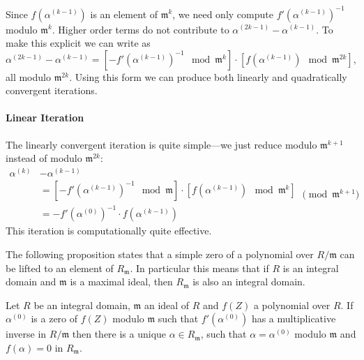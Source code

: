 {Since $f(\alpha^{(k-1)})$ is an element of $\mathfrak{m}^k$, we need
only compute $f'(\alpha^{(k-1)})^{-1}$ modulo $\mathfrak{m}^k$.
Higher order terms do not contribute to $\alpha^{(2k-1)} -
\alpha^{(k-1)}$.  To make this explicit we can write
 as
\begin{equation}\label{Explicit:UNewton:Eq}
\alpha^{(2k-1)} - \alpha^{(k-1)} = 
\left[ - f'(\alpha^{(k-1)})^{-1} \mod{\mathfrak{m}^k}\right]
\cdot
\left[f(\alpha^{(k-1)}) \mod{\mathfrak{m}^{2k}}\right],
\end{equation}
all modulo $\mathfrak{m}^{2k}$.  Using this form we can produce both
linearly and quadratically convergent iterations.

\paragraph{Linear Iteration}

The linearly convergent iteration is quite simple---we just reduce
 modulo $\mathfrak{m}^{k+1}$ instead of
modulo $\mathfrak{m}^{2k}$:
\begin{equation}
\label{Modified:UNewton:Eq}
  \begin {aligned}
  \alpha^{(k)} &- \alpha^{(k-1)} \\
     &=
    \left[ - f'(\alpha^{(k-1)})^{-1} \mod{\mathfrak{m}}\right]
    \cdot
    \left[f(\alpha^{(k-1)}) \mod{\mathfrak{m}^k}\right]\\
    & = - f'(\alpha^{(0)})^{-1} \cdot f(\alpha^{(k-1)})
  \end{aligned}
  \pmod{\mathfrak{m}^{k+1}}
\end{equation}
This iteration is computationally quite effective.

The following proposition states that a simple zero of a polynomial
over $R/\mathfrak{m}$ can be lifted to an element of $R_\mathfrak{m}$.
In particular this means that if $R$ is an integral domain and
$\mathfrak{m}$ is a maximal ideal, then $R_\mathfrak{m}$ is also an
integral domain.

\begin{proposition} \label{UNewton:Iter:Prop}
Let $R$ be an integral domain, $\mathfrak{m}$ an ideal of $R$ and $f(Z)$
a polynomial over $R$.  If $\alpha^{(0)}$ is a zero of $f(Z)$ modulo
$\mathfrak{m}$ such that $f'(\alpha^{(0)})$ has a multiplicative inverse
in $R/\mathfrak{m}$ then there is a unique $\alpha \in R_{\mathfrak{m}}$,
such that $\alpha = \alpha^{(0)}$ modulo $\mathfrak{m}$ and $f(\alpha) =
0$ in $R_{\mathfrak{m}}$.
\end{proposition}

}
